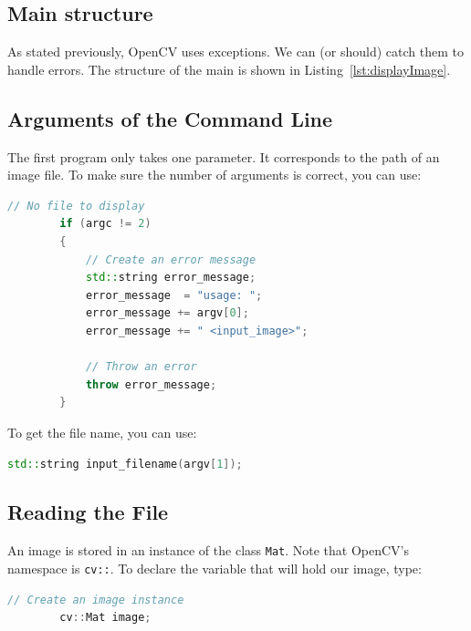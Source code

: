 \documentclass[english,a4paper,12pt,oneside]{article}
\begin{document}
\subsection{Main structure}

As stated previously, OpenCV uses exceptions. 
We can (or should) catch them to handle errors. 
The structure of the main is shown in Listing~\ref{lst:displayImage}.




\subsection{Arguments of the Command Line}

The first program only takes one parameter. 
It corresponds to the path of an image file. To make sure the number of arguments is correct, you can use:

 \begin{lstlisting}[language=c++,caption=Checking the number of command line arguments.]
       // No file to display
        if (argc != 2)
        {
            // Create an error message
            std::string error_message;
            error_message  = "usage: ";
            error_message += argv[0];
            error_message += " <input_image>";

            // Throw an error
            throw error_message;
        }
\end{lstlisting}

To get the file name, you can use:
\begin{lstlisting}[language=c++,caption=Getting the file name from the command line arguments.]
std::string input_filename(argv[1]);
\end{lstlisting}

\subsection{Reading the File}

An image is stored in an instance of the class  \verb+Mat+. 
Note that OpenCV's namespace is \verb+cv::+. 
To declare the variable that will hold our image, type:
 \begin{lstlisting}[language=c++]
        // Create an image instance
        cv::Mat image;
\end{lstlisting}
\end{document}
